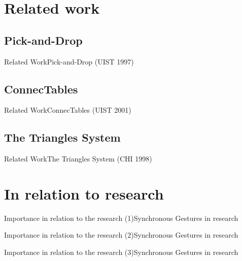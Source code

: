 \documentclass[10pt]{beamer}
\begin{document}
\section{Related work}
\subsection{Pick-and-Drop}
\begin{frame}{Related Work}{Pick-and-Drop (UIST 1997)}

\end{frame}

\subsection{ConnecTables}
\begin{frame}{Related Work}{ConnecTables (UIST 2001)}

\end{frame}

\subsection{The Triangles System}
\begin{frame}{Related Work}{The Triangles System (CHI 1998)}

\end{frame}

\section{In relation to research}
\begin{frame}{Importance in relation to the research (1)}{Synchronous Gestures in research}

\end{frame}

\begin{frame}{Importance in relation to the research (2)}{Synchronous Gestures in research}

\end{frame}

\begin{frame}{Importance in relation to the research (3)}{Synchronous Gestures in research}

\end{frame}

\end{document}
